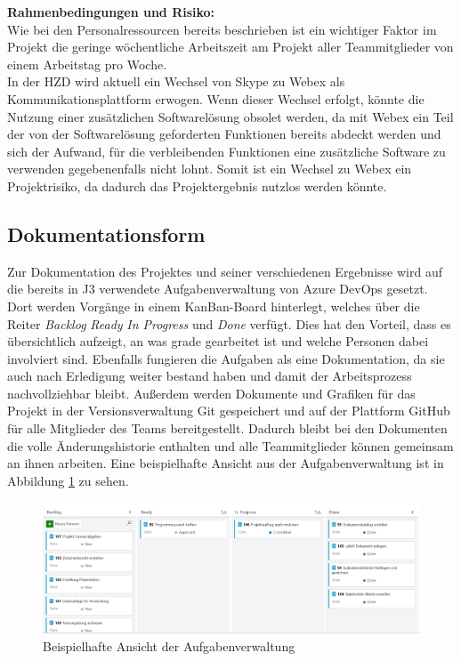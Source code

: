 \documentclass[ThesisDJ.tex]{subfiles}
\begin{document}
	\textbf{Rahmenbedingungen und Risiko:}\medskip\\
	Wie bei den Personalressourcen bereits beschrieben ist ein wichtiger Faktor im Projekt die geringe wöchentliche Arbeitszeit am Projekt aller Teammitglieder von einem Arbeitstag pro Woche.\\	
	In der HZD wird aktuell ein Wechsel von Skype zu Webex als Kommunikationsplattform erwogen. Wenn dieser Wechsel erfolgt, könnte die Nutzung einer zusätzlichen Softwarelösung obsolet werden, da mit Webex ein Teil der von der Softwarelösung geforderten Funktionen bereits abdeckt werden und sich der Aufwand, für die verbleibenden Funktionen eine zusätzliche Software zu verwenden gegebenenfalls nicht lohnt. Somit ist ein Wechsel zu Webex ein Projektrisiko, da dadurch das Projektergebnis nutzlos werden könnte. 

	
	\subsection{Dokumentationsform}
  Zur Dokumentation des Projektes und seiner verschiedenen Ergebnisse wird auf die bereits in J3 verwendete Aufgabenverwaltung von Azure DevOps gesetzt.
  Dort werden Vorgänge in einem KanBan-Board hinterlegt, welches über die Reiter \emph{Backlog} \emph{Ready} \emph{In Progress} und \emph{Done} verfügt.
  Dies hat den Vorteil, dass es übersichtlich aufzeigt, an was grade gearbeitet ist und welche Personen dabei involviert sind. Ebenfalls fungieren die 
  Aufgaben als eine Dokumentation, da sie auch nach Erledigung weiter bestand haben und damit der Arbeitsprozess nachvollziehbar bleibt. Außerdem werden 
  Dokumente und Grafiken für das Projekt in der Versionsverwaltung Git gespeichert und auf der Plattform GitHub für alle Mitglieder des Teams bereitgestellt. Dadurch bleibt 
  bei den Dokumenten die volle Änderungshistorie enthalten und alle Teammitglieder können gemeinsam an ihnen arbeiten. Eine beispielhafte 
  Ansicht aus der Aufgabenverwaltung ist in Abbildung \ref{fig:taskmgmt} zu sehen.

  \begin{figure}
    \includegraphics[scale=0.5]{ADO_Board.png}
    \centering
    \caption{Beispielhafte Ansicht der Aufgabenverwaltung}
    \label{fig:taskmgmt}
  \end{figure}
	
\end{document}
